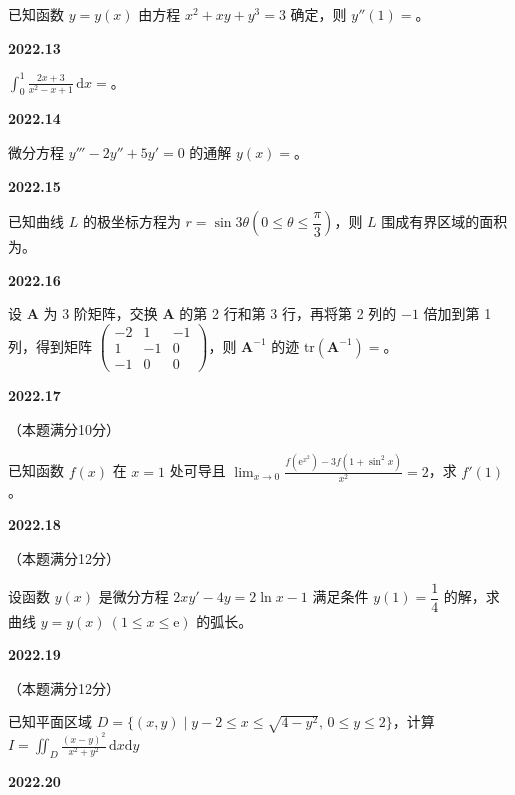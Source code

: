 \documentclass[UTF8,12pt,fontset=windows]{ctexart}
\begin{document}
已知函数 $y = y(x)$ 由方程 $x^2 + xy + y^3 = 3$ 确定，则 $y''(1) =$\underline{\hspace{20mm}}。

\vfill
\newpage
{\large\bfseries 2022.13}

$\int_{0}^{1}\frac{2x+3}{x^2-x+1}\,\mathrm{d}x =$\underline{\hspace{20mm}}。

\vfill
\newpage
{\large\bfseries 2022.14}

微分方程 $y''' - 2y'' + 5y' = 0$ 的通解 $y(x) =$\underline{\hspace{20mm}}。

\vfill
\newpage
{\large\bfseries 2022.15}

已知曲线 $L$ 的极坐标方程为 $r = \sin 3\theta\left(0 \leqslant \theta \leqslant \dfrac{\pi}{3}\right)$，则 $L$ 围成有界区域的面积为\underline{\hspace{20mm}}。

\vfill
\newpage
{\large\bfseries 2022.16}

设 $\boldsymbol{A}$ 为 3 阶矩阵，交换 $\boldsymbol{A}$ 的第 2 行和第 3 行，再将第 2 列的 $-1$ 倍加到第 1 列，得到矩阵 $\begin{pmatrix} -2 & 1 & -1 \\ 1 & -1 & 0 \\ -1 & 0 & 0 \end{pmatrix}$，则 $\boldsymbol{A}^{-1}$ 的迹 $\mathrm{tr}(\boldsymbol{A}^{-1}) =$\underline{\hspace{20mm}}。

\vfill
\newpage
{\large\bfseries 2022.17}

（本题满分10分）

已知函数 $f(x)$ 在 $x = 1$ 处可导且 $\lim_{x\to 0}\frac{f(\mathrm{e}^{x^2}) - 3f(1+\sin^2 x)}{x^2} = 2$，求 $f'(1)$。

\vfill
\newpage
{\large\bfseries 2022.18}

（本题满分12分）

设函数 $y(x)$ 是微分方程 $2xy' - 4y = 2\ln x - 1$ 满足条件 $y(1) = \dfrac{1}{4}$ 的解，求曲线 $y = y(x)\ (1 \leqslant x \leqslant \mathrm{e})$ 的弧长。

\vfill
\newpage
{\large\bfseries 2022.19}

（本题满分12分）

已知平面区域 $D = \{(x,y) \mid y - 2 \leqslant x \leqslant \sqrt{4-y^2},\, 0 \leqslant y \leqslant 2\}$，计算 $I = \iint_D \frac{(x-y)^2}{x^2+y^2}\,\mathrm{d}x\mathrm{d}y$

\vfill
\newpage
{\large\bfseries 2022.20}
\end{document}
